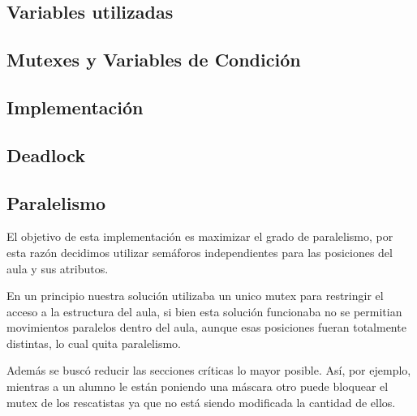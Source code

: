 \subsection{Variables utilizadas}


\subsection{Mutexes y Variables de Condición}


\subsection{Implementación}


\subsection{Deadlock}


\subsection{Paralelismo}
El objetivo de esta implementación es maximizar el grado de paralelismo, por esta razón decidimos utilizar semáforos independientes para las posiciones
del aula y sus atributos.

En un principio nuestra solución utilizaba un unico mutex para restringir el acceso a la estructura del aula, si bien esta solución funcionaba
no se permitian movimientos paralelos dentro del aula, aunque esas posiciones fueran totalmente distintas, lo cual quita paralelismo.

Además se buscó reducir las secciones críticas lo mayor posible. Así, por ejemplo, mientras a un alumno le están poniendo una máscara otro puede bloquear el mutex
de los rescatistas ya que no está siendo modificada la cantidad de ellos.

